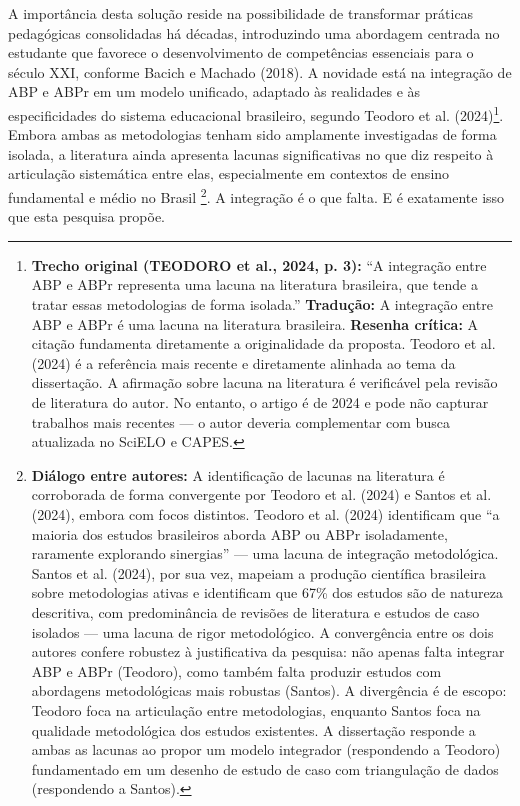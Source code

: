 A importância desta solução reside na possibilidade de transformar práticas pedagógicas consolidadas há décadas, introduzindo uma abordagem centrada no estudante que favorece o desenvolvimento de competências essenciais para o século XXI, conforme Bacich e Machado (2018). A novidade está na integração de ABP e ABPr em um modelo unificado, adaptado às realidades e às especificidades do sistema educacional brasileiro, segundo Teodoro et al. (2024)\footnote{\textbf{Trecho original (TEODORO et al., 2024, p. 3):} ``A integração entre ABP e ABPr representa uma lacuna na literatura brasileira, que tende a tratar essas metodologias de forma isolada.'' \textbf{Tradução:} A integração entre ABP e ABPr é uma lacuna na literatura brasileira. \textbf{Resenha crítica:} A citação fundamenta diretamente a originalidade da proposta. Teodoro et al. (2024) é a referência mais recente e diretamente alinhada ao tema da dissertação. A afirmação sobre lacuna na literatura é verificável pela revisão de literatura do autor. No entanto, o artigo é de 2024 e pode não capturar trabalhos mais recentes — o autor deveria complementar com busca atualizada no SciELO e CAPES.}. Embora ambas as metodologias tenham sido amplamente investigadas de forma isolada, a literatura ainda apresenta lacunas significativas no que diz respeito à articulação sistemática entre elas, especialmente em contextos de ensino fundamental e médio no Brasil \cite{BARBOSA2013}\footnote{\textbf{Diálogo entre autores:} A identificação de lacunas na literatura é corroborada de forma convergente por Teodoro et al. (2024) e Santos et al. (2024), embora com focos distintos. Teodoro et al. (2024) identificam que ``a maioria dos estudos brasileiros aborda ABP ou ABPr isoladamente, raramente explorando sinergias'' — uma lacuna de integração metodológica. Santos et al. (2024), por sua vez, mapeiam a produção científica brasileira sobre metodologias ativas e identificam que 67\% dos estudos são de natureza descritiva, com predominância de revisões de literatura e estudos de caso isolados — uma lacuna de rigor metodológico. A convergência entre os dois autores confere robustez à justificativa da pesquisa: não apenas falta integrar ABP e ABPr (Teodoro), como também falta produzir estudos com abordagens metodológicas mais robustas (Santos). A divergência é de escopo: Teodoro foca na articulação entre metodologias, enquanto Santos foca na qualidade metodológica dos estudos existentes. A dissertação responde a ambas as lacunas ao propor um modelo integrador (respondendo a Teodoro) fundamentado em um desenho de estudo de caso com triangulação de dados (respondendo a Santos).}. A integração é o que falta. E é exatamente isso que esta pesquisa propõe.

